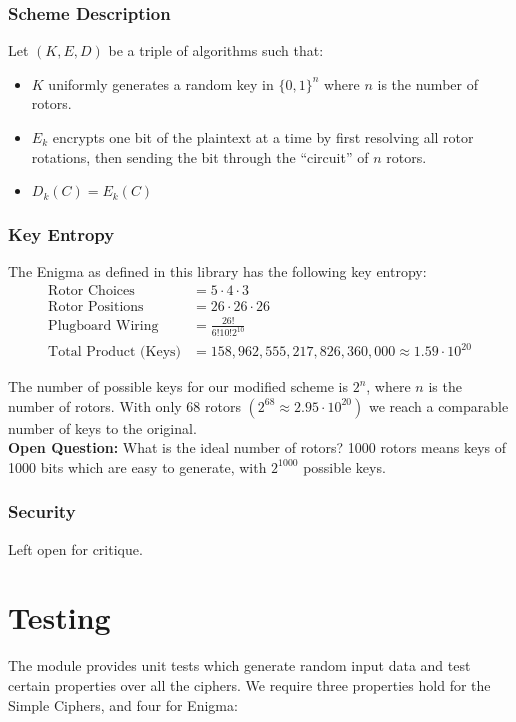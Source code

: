 \documentclass{article}
\begin{document}
\subsubsection{Scheme Description}
Let $(K,E,D)$ be a triple of algorithms such that:
\begin{itemize}
\item $K$ uniformly generates a random key in $\{0,1\}^n$ where $n$ is the
  number of rotors.
\item $E_k$ encrypts one bit of the plaintext at a time by first resolving
  all rotor rotations, then sending the bit through the ``circuit'' of
  $n$ rotors.
\item $D_k(C) = E_k(C)$
\end{itemize}

\subsubsection{Key Entropy}
The Enigma as defined in this library has the following key entropy:
\begin{align*}
  \text{Rotor Choices} &= 5 \cdot 4 \cdot 3\\
  \text{Rotor Positions} &= 26 \cdot 26 \cdot 26\\
  \text{Plugboard Wiring} &= \frac{26!}{6!10!2^{10}}\\
  \text{Total Product (Keys)} &= 158,962,555,217,826,360,000 \approx 1.59 \cdot 10^{20}
\end{align*}

The number of possible keys for our modified scheme is $2^n$, where $n$
is the number of rotors. With only 68 rotors
$(2^{68} \approx 2.95 \cdot 10^{20})$ we reach a comparable number of
keys to the original. \\

\textbf{Open Question:} What is the ideal number of rotors? 1000 rotors
means keys of 1000 bits which are easy to generate,
with $2^{1000}$ possible keys.

\subsubsection{Security}
Left open for critique.


\section{Testing}
The module  provides unit tests which
generate random input data and test certain properties over all the
ciphers. We require three properties hold for the Simple Ciphers, and four
for Enigma:
\end{document}
